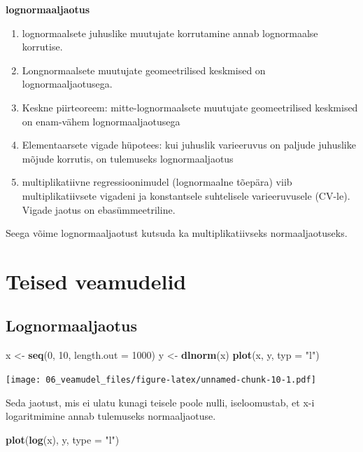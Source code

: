 \documentclass[]{book}
\newenvironment{Shaded}{\begin{snugshade}}{\end{snugshade}}
\newcommand{\KeywordTok}[1]{\textcolor[rgb]{0.13,0.29,0.53}{\textbf{#1}}}
\newcommand{\DataTypeTok}[1]{\textcolor[rgb]{0.13,0.29,0.53}{#1}}
\newcommand{\DecValTok}[1]{\textcolor[rgb]{0.00,0.00,0.81}{#1}}
\newcommand{\StringTok}[1]{\textcolor[rgb]{0.31,0.60,0.02}{#1}}
\newcommand{\NormalTok}[1]{#1}
\begin{document}
\textbf{lognormaaljaotus}

\begin{enumerate}
\def\labelenumi{\arabic{enumi}.}
\item
  lognormaalsete juhuslike muutujate korrutamine annab lognormaalse
  korrutise.
\item
  Longnormaalsete muutujate geomeetrilised keskmised on
  lognormaaljaotusega.
\item
  Keskne piirteoreem: mitte-lognormaalsete muutujate geomeetrilised
  keskmised on enam-vähem lognormaaljaotusega
\item
  Elementaarsete vigade hüpotees: kui juhuslik varieeruvus on paljude
  juhuslike mõjude korrutis, on tulemuseks lognormaaljaotus
\item
  multiplikatiivne regressioonimudel (lognormaalne tõepära) viib
  multiplikatiivsete vigadeni ja konstantsele suhtelisele varieeruvusele
  (CV-le). Vigade jaotus on ebasümmeetriline.
\end{enumerate}

Seega võime lognormaaljaotust kutsuda ka multiplikatiivseks
normaaljaotuseks.

\section{Teised veamudelid}\label{teised-veamudelid}

\subsection{Lognormaaljaotus}\label{lognormaaljaotus}

\begin{Shaded}
\begin{Highlighting}[]
\NormalTok{x <-}\StringTok{ }\KeywordTok{seq}\NormalTok{(}\DecValTok{0}\NormalTok{, }\DecValTok{10}\NormalTok{, }\DataTypeTok{length.out =} \DecValTok{1000}\NormalTok{)}
\NormalTok{y <-}\StringTok{ }\KeywordTok{dlnorm}\NormalTok{(x)}
\KeywordTok{plot}\NormalTok{(x, y, }\DataTypeTok{typ =} \StringTok{"l"}\NormalTok{)}
\end{Highlighting}
\end{Shaded}

\texttt{[image: 06\_veamudel\_files/figure-latex/unnamed-chunk-10-1.pdf]}

Seda jaotust, mis ei ulatu kunagi teisele poole nulli, iseloomustab, et
x-i logaritmimine annab tulemuseks normaaljaotuse.

\begin{Shaded}
\begin{Highlighting}[]
\KeywordTok{plot}\NormalTok{(}\KeywordTok{log}\NormalTok{(x), y, }\DataTypeTok{type =} \StringTok{"l"}\NormalTok{)}
\end{Highlighting}
\end{Shaded}
\end{document}
